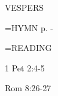 \begin{flushleft}\normalsize VESPERS\\\end{flushleft}

\hangindent=\parindent \small{\uppercase{HYMN} p. \pageref{easter:firstHymn}-\pageref{easter:lastHymn}\\}

\hangindent=\parindent \small READING
\begin{description}[labelindent=\parindent, leftmargin=*]
\item [1st-6th Week:]     1 Pet 2:4-5 \textbf{    \\}
\item [7th Week:]     Rom 8:26-27 \textbf{    \\}
\end{description}
